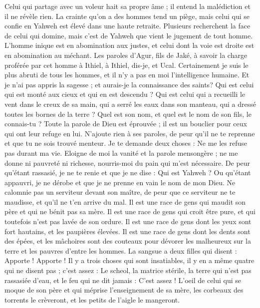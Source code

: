 \begin{multicols}{2}
Celui qui partage avec un voleur hait sa propre âme ; il entend la malédiction et il ne révèle rien.
La crainte qu'on a des hommes tend un piège, mais celui qui se confie en Yahweh est élevé dans une haute retraite.
Plusieurs recherchent la face de celui qui domine, mais c'est de Yahweh que vient le jugement de tout homme.
L'homme inique est en abomination aux justes, et celui dont la voie est droite est en abomination au méchant.
\VerseOne{}Les paroles d'Agur, fils de Jaké, à savoir la charge proférée par cet homme à Ithiel, à Ithiel, dis-je, et Ucal.
Certainement je suis le plus abruti de tous les hommes, et il n'y a pas en moi l'intelligence humaine.
Et je n'ai pas appris la sagesse ; et aurais-je la connaissance des saints?
Qui est celui qui est monté aux cieux et qui en est descendu ? Qui est celui qui a recueilli le vent dans le creux de sa main, qui a serré les eaux dans son manteau, qui a dressé toutes les bornes de la terre ? Quel est son nom, et quel est le nom de son fils, le connais-tu ?
Toute la parole de Dieu est éprouvée ; il est un bouclier pour ceux qui ont leur refuge en lui.
N'ajoute rien à ses paroles, de peur qu'il ne te reprenne et que tu ne sois trouvé menteur.
Je te demande deux choses : Ne me les refuse pas durant ma vie.
Eloigne de moi la vanité et la parole mensongère ; ne me donne ni pauvreté ni richesse, nourris-moi du pain qui m'est nécessaire.
De peur qu'étant rassasié, je ne te renie et que je ne dise : Qui est Yahweh ? Ou qu'étant appauvri, je ne dérobe et que je ne prenne en vain le nom de mon Dieu.
Ne calomnie pas un serviteur devant son maître, de peur que ce serviteur ne te maudisse, et qu'il ne t'en arrive du mal.
Il est une race de gens qui maudit son père et qui ne bénit pas sa mère.
Il est une race de gens qui croit être pure, et qui toutefois n'est pas lavée de son ordure.
Il est une race de gens dont les yeux sont fort hautains, et les paupières élevées.
Il est une race de gens dont les dents sont des épées, et les mâchoires sont des couteaux pour dévorer les malheureux sur la terre et les pauvres d'entre les hommes.
La sangsue a deux filles qui disent : Apporte ! Apporte ! Il y a trois choses qui sont insatiables, il y en a même quatre qui ne disent pas ; c'est assez :
Le scheol, la matrice stérile, la terre qui n'est pas rassasiée d'eau, et le feu qui ne dit jamais : C'est assez !
L'oeil de celui qui se moque de son père et qui méprise l'enseignement de sa mère, les corbeaux des torrents le crèveront, et les petits de l'aigle le mangeront.

\end{multicols}
